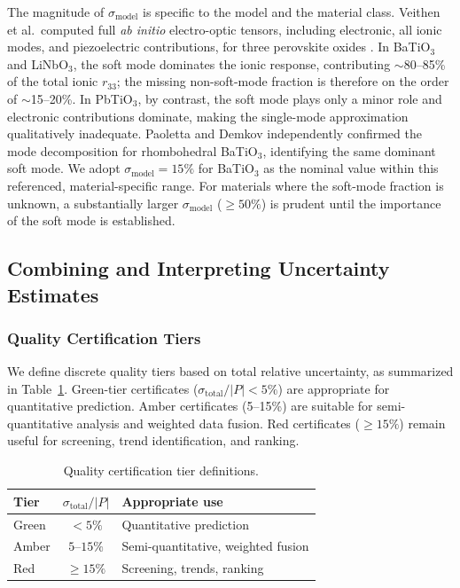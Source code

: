 \documentclass[twocolumn,superscriptaddress,amsmath,amssymb,longbibliography]{revtex4-2}
\begin{document}
The magnitude of $\sigma_{\mathrm{model}}$ is specific to the model and
the material class. Veithen et al.\ computed full \emph{ab initio}
electro-optic tensors, including electronic, all ionic modes, and
piezoelectric contributions, for three perovskite
oxides \cite{Veithen2004_PRL,Veithen2005}. In BaTiO$_3$ and LiNbO$_3$,
the soft mode dominates the ionic response, contributing $\sim$80--85\% of
the total ionic $r_{33}$; the missing non-soft-mode fraction is therefore
on the order of $\sim$15--20\%. In PbTiO$_3$, by contrast, the soft mode plays only a
minor role and electronic contributions dominate, making the single-mode
approximation qualitatively inadequate. Paoletta and
Demkov \cite{Paoletta2021} independently confirmed the mode decomposition
for rhombohedral BaTiO$_3$, identifying the same dominant soft mode.
We adopt $\sigma_{\mathrm{model}} = 15\%$ for BaTiO$_3$ as the nominal value
within this referenced, material-specific range. For materials where the soft-mode
fraction is unknown, a substantially larger $\sigma_{\mathrm{model}}$
($\geq 50\%$) is prudent until the importance of the soft mode is established.

\subsection{Combining and Interpreting Uncertainty Estimates}
\label{sec:interpretation}

\subsubsection{Quality Certification Tiers}
\label{sec:tiers}

We define discrete quality tiers based on total relative uncertainty, as
summarized in Table~\ref{tab:tiers}. Green-tier certificates
($\sigma_{\mathrm{total}}/|P| < 5\%$) are appropriate for quantitative
prediction. Amber certificates (5--15\%) are suitable for semi-quantitative
analysis and weighted data fusion. Red certificates ($\geq 15\%$) remain
useful for screening, trend identification, and ranking.

\begin{table}
\caption{Quality certification tier definitions.}
\label{tab:tiers}
\begin{tabular}{lcl}
\toprule
Tier & $\sigma_{\mathrm{total}}/|P|$ & Appropriate use \\
\midrule
Green & $< 5\%$ & Quantitative prediction \\
Amber & $5$--$15\%$ & Semi-quantitative, weighted fusion \\
Red & $\geq 15\%$ & Screening, trends, ranking \\
\bottomrule
\end{tabular}
\end{table}
\end{document}
